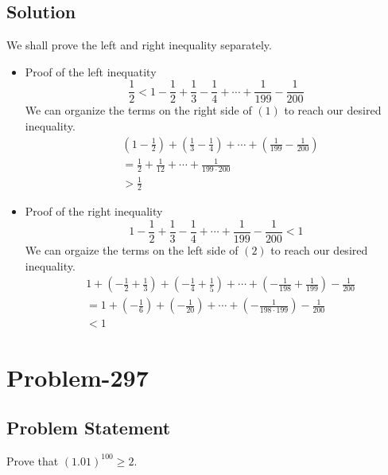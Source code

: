 \documentclass[12pt]{article}
\begin{document}
\subsection*{Solution}
We shall prove the left and right inequality separately.
\begin{itemize}
	\item Proof of the left inequatity
	\setcounter{equation}{0}
	\begin{equation}
		\frac{1}{2} < 1 - \frac{1}{2} + \frac{1}{3} - \frac{1}{4} + \cdots + \frac{1}{199} - \frac{1}{200}
	\end{equation}
	We can organize the terms on the right side of $(1)$ to reach our desired inequality.
	\begin{equation*}
		\begin{aligned}
			& \left(1 - \frac{1}{2}\right) + \left( \frac{1}{3} - \frac{1}{4} \right) + \cdots + \left( \frac{1}{199} - \frac{1}{200} \right)\\
			&= \frac{1}{2} + \frac{1}{12} + \cdots + \frac{1}{199 \cdot 200}\\
			& > \frac{1}{2}
		\end{aligned}
	\end{equation*}
	
	\item Proof of the right inequality
	\begin{equation}
		1 - \frac{1}{2} + \frac{1}{3} - \frac{1}{4} + \cdots + \frac{1}{199} - \frac{1}{200} < 1
	\end{equation}
	We can orgaize the terms on the left side of $(2)$ to reach our desired inequality.
	\begin{equation*}
		\begin{aligned}
			& 1 + \left( -\frac{1}{2}+\frac{1}{3} \right) + \left( -\frac{1}{4} + \frac{1}{5} \right) + \cdots + \left( -\frac{1}{198}+\frac{1}{199} \right) - \frac{1}{200}\\
			&= 1 + \left( -\frac{1}{6} \right) + \left( -\frac{1}{20} \right) + \cdots + \left( -\frac{1}{198 \cdot 199} \right) - \frac{1}{200}\\
			&< 1
		\end{aligned}
	\end{equation*}
\end{itemize}

\section*{Problem-297}
\subsection*{Problem Statement}
Prove that $(1.01)^{100} \geq 2$.
\end{document}
